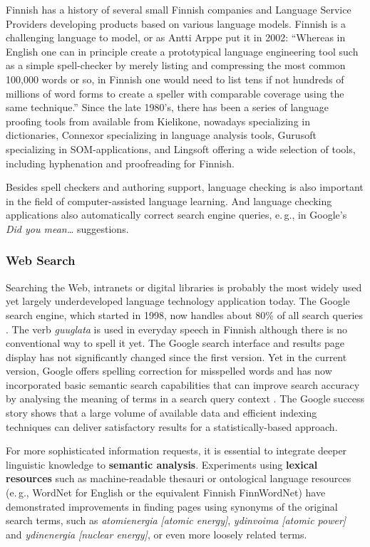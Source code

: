 \begin{multicols}{2}
Finnish has a history of several small Finnish companies and Language Service Providers developing products based on various language models. Finnish is a challenging language to model, or as Antti Arppe put it in 2002: ``Whereas in English one can in principle create a prototypical language engineering tool such as a simple spell-checker by merely listing and compressing the most common 100,000 words or so, in Finnish one would need to list tens if not hundreds of millions of word forms to create a speller with comparable coverage using the same technique.'' \cite{NoPath} Since the late 1980's, there has been a series of language proofing tools from available from Kielikone, nowadays specializing in dictionaries, Connexor specializing in language analysis tools, Gurusoft specializing in SOM-applications, and Lingsoft offering a wide selection of tools, including hyphenation and proofreading for Finnish.

Besides spell checkers and authoring support, language checking is also important in the field of computer-assisted language learning. And language checking applications also automatically correct search engine queries, e.\,g., in Google's \textit{Did you mean\dots} suggestions.

\subsubsection{Web Search}

Searching the Web, intranets or digital libraries is probably the most widely used yet largely underdeveloped language technology application today. The Google search engine, which started in 1998, now handles about 80\% of all search queries \cite{spi1}. The verb \textit{\foreignlanguage{finnish}{\textit{guuglata}}} is used in everyday speech in Finnish although there is no conventional way to spell it yet. The Google search interface and results page display has not significantly changed since the first version. Yet in the current version, Google offers spelling correction for misspelled words and has now incorporated basic semantic search capabilities that can improve search accuracy by analysing the meaning of terms in a search query context \cite{Google-rolls}. The Google success story shows that a large volume of available data and efficient indexing techniques can deliver satisfactory results for a statistically-based approach.

For more sophisticated information requests, it is essential to integrate deeper linguistic knowledge to \textbf{semantic analysis}. Experiments using \textbf{lexical resources} such as machine-readable thesauri or ontological language resources (e.\,g., WordNet for English or the equivalent Finnish FinnWordNet) have demonstrated improvements in finding pages using synonyms of the original search terms, such as {\foreignlanguage{finnish}{\textit{atomienergia}}} \textit{[atomic energy]}, {\foreignlanguage{finnish}{\textit{ydinvoima}}} \textit{[atomic power]} and {\foreignlanguage{finnish}{\textit{ydinenergia}}} \textit{[nuclear energy]}, or even more loosely related terms.


\end{multicols}
